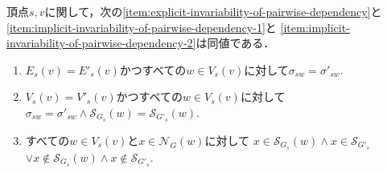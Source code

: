 \begin{lemma}
  \label{lemma:transformation-of-invariability-of-pairwise-dependency}
  頂点$s,v$に関して，次の\ref{item:explicit-invariability-of-pairwise-dependency}と
  \ref{item:implicit-invariability-of-pairwise-dependency-1}と
  \ref{item:implicit-invariability-of-pairwise-dependency-2}は同値である．
  \begin{enumerate}[label=(\alph*)]
  \item $E_s(v)=E'_s(v)$かつすべての$w\in V_s(v)$に対して$\sigma_{sw}=\sigma'_{sw}$.
    \label{item:explicit-invariability-of-pairwise-dependency}
  \item $V_s(v)=V'_s(v)$かつすべての$w\in V_s(v)$に対して
    $\sigma_{sw}=\sigma'_{sw}\land\mathcal{S}_{G_s}(w)=\mathcal{S}_{G'_s}(w)$.
    \label{item:implicit-invariability-of-pairwise-dependency-1}
  \item すべての$w\in V_s(v)$と$x\in\mathcal{N}_G(w)$に対して
    $x\in\mathcal{S}_{G_s}(w)\land x\in\mathcal{S}_{G'_s}$
    $\lor x\notin\mathcal{S}_{G_s}(w)\land x\notin\mathcal{S}_{G'_s}$.
    \label{item:implicit-invariability-of-pairwise-dependency-2}
  \end{enumerate}
\end{lemma}
